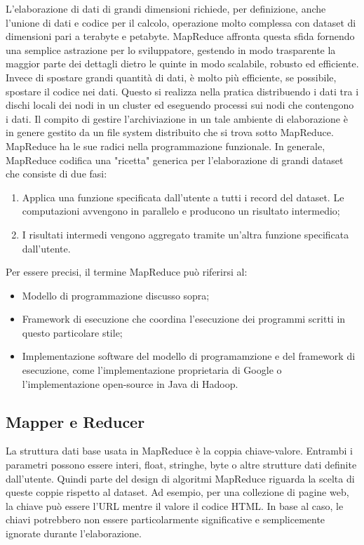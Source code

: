 \documentclass{article}
\begin{document}
L'elaborazione di dati di grandi dimensioni richiede, per definizione, anche l'unione di dati e codice per il calcolo, operazione molto complessa con dataset di dimensioni pari a terabyte e petabyte. MapReduce affronta questa sfida fornendo una semplice astrazione per lo sviluppatore, gestendo in modo trasparente la maggior parte dei dettagli dietro le quinte in modo scalabile, robusto ed efficiente. Invece di spostare grandi quantità di dati, è molto più efficiente, se possibile, spostare il codice nei dati. Questo si realizza nella pratica distribuendo i dati tra i dischi locali dei nodi in un cluster ed eseguendo processi sui nodi che contengono i dati. Il compito di gestire l'archiviazione in un tale ambiente di elaborazione è in genere gestito da un file system distribuito che si trova sotto MapReduce.\\

\noindent MapReduce ha le sue radici nella programmazione funzionale. In generale, MapReduce codifica una "ricetta" generica per l'elaborazione di grandi dataset che consiste di due fasi:
\begin{enumerate}
    \item Applica una funzione specificata dall'utente a tutti i record del dataset. Le computazioni avvengono in parallelo e producono un risultato intermedio;
    \item I risultati intermedi vengono aggregato tramite un'altra funzione specificata dall'utente.
\end{enumerate}

\noindent Per essere precisi, il termine MapReduce può riferirsi al:
\begin{itemize}
    \item Modello di programmazione discusso sopra;
    \item Framework di esecuzione che coordina l'esecuzione dei programmi scritti in questo particolare stile;
    \item Implementazione software del modello di programamzione e del framework di esecuzione, come l'implementazione proprietaria di Google o l'implementazione open-source in Java di Hadoop.
\end{itemize}

\subsection{Mapper e Reducer}
La struttura dati base usata in MapReduce è la coppia chiave-valore. Entrambi i parametri possono essere interi, float, stringhe, byte o altre strutture dati definite dall'utente. Quindi parte del design di algoritmi MapReduce riguarda la scelta di queste coppie rispetto al dataset. Ad esempio, per una collezione di pagine web, la chiave può essere l'URL mentre il valore il codice HTML. In base al caso, le chiavi potrebbero non essere particolarmente significative e semplicemente ignorate durante l'elaborazione. 
\end{document}
